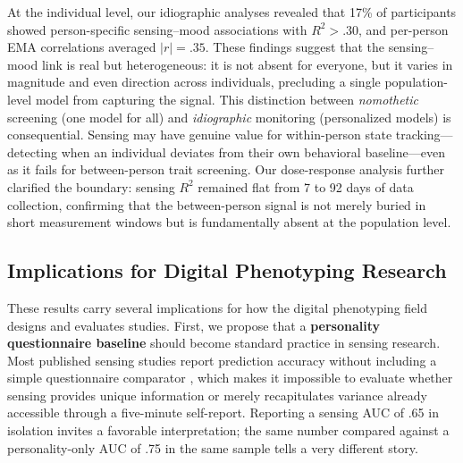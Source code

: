 \documentclass[12pt, a4paper]{article}
\begin{document}
At the individual level, our idiographic analyses revealed that 17\% of participants showed person-specific sensing--mood associations with $R^2 > .30$, and per-person EMA correlations averaged $|r| = .35$. These findings suggest that the sensing--mood link is real but heterogeneous: it is not absent for everyone, but it varies in magnitude and even direction across individuals, precluding a single population-level model from capturing the signal. This distinction between \textit{nomothetic} screening (one model for all) and \textit{idiographic} monitoring (personalized models) is consequential. Sensing may have genuine value for within-person state tracking---detecting when an individual deviates from their own behavioral baseline---even as it fails for between-person trait screening. Our dose-response analysis further clarified the boundary: sensing $R^2$ remained flat from 7 to 92 days of data collection, confirming that the between-person signal is not merely buried in short measurement windows but is fundamentally absent at the population level.

\subsection{Implications for Digital Phenotyping Research}

These results carry several implications for how the digital phenotyping field designs and evaluates studies. First, we propose that a \textbf{personality questionnaire baseline} should become standard practice in sensing research. Most published sensing studies report prediction accuracy without including a simple questionnaire comparator \citep{chikersal2021detecting, wang2018sensing, saeb2015mobile}, which makes it impossible to evaluate whether sensing provides unique information or merely recapitulates variance already accessible through a five-minute self-report. Reporting a sensing AUC of .65 in isolation invites a favorable interpretation; the same number compared against a personality-only AUC of .75 in the same sample tells a very different story.
\end{document}
